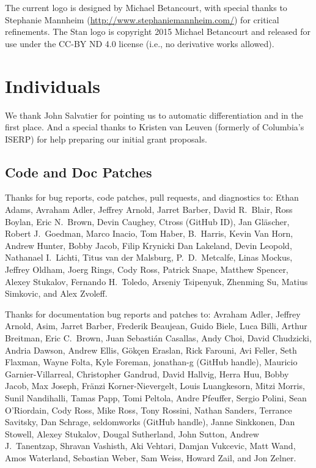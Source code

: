 The current logo is designed by Michael Betancourt, with special
thanks to Stephanie Mannheim (\url{http://www.stephaniemannheim.com/})
for critical refinements.  The Stan logo is copyright 2015 Michael
Betancourt and released for use under the CC-BY ND 4.0 license (i.e.,
no derivative works allowed).


\section*{Individuals}

We thank John Salvatier for pointing us to automatic differentiation
and \HMC in the first place.  And a special thanks to Kristen van
Leuven (formerly of Columbia's ISERP) for help preparing our initial
grant proposals.

\subsection*{Code  and Doc Patches}

Thanks for bug reports, code patches, pull requests, and diagnostics
to:
Ethan Adams,
Avraham Adler,
Jeffrey Arnold,
Jarret Barber,
David R.~Blair,
Ross Boylan,
Eric N.~Brown,
Devin Caughey,
Ctross (GitHub ID),
Jan Gl\"ascher,
Robert J.\ Goedman,
Marco Inacio,
Tom Haber,
B.~Harris,
Kevin Van Horn,
Andrew Hunter,
Bobby Jacob,
Filip Krynicki
Dan Lakeland,
Devin Leopold,
Nathanael I.~Lichti,
Titus van der Malsburg,
P.~D.~Metcalfe,
Linas Mockus,
Jeffrey Oldham,
Joerg Rings,
Cody Ross,
Patrick Snape,
Matthew Spencer,
Alexey Stukalov,
Fernando H.~Toledo,
Arseniy Tsipenyuk,
Zhenming Su,
Matius Simkovic, and
Alex Zvoleff.

Thanks for documentation bug reports and patches to:
Avraham Adler,
Jeffrey Arnold,
Asim,
Jarret Barber,
Frederik Beaujean,
Guido Biele,
Luca Billi,
Arthur Breitman,
Eric C.~Brown,
Juan Sebasti\'an Casallas,
Andy Choi,
David Chudzicki,
Andria Dawson,
Andrew Ellis,
G\"{o}k\c{c}en Eraslan,
Rick Farouni,
Avi Feller,
Seth Flaxman,
Wayne Folta,
Kyle Foreman,
jonathan-g (GitHub handle),
Mauricio Garnier-Villarreal,
Christopher Gandrud,
David Hallvig,
Herra Huu,
Bobby Jacob,
Max Joseph,
Fr\"anzi Korner-Nievergelt,
Louis Luangkesorn,
Mitzi Morris,
Sunil Nandihalli,
Tamas Papp,
Tomi Peltola,
Andre Pfeuffer,
Sergio Polini,
Sean O'Riordain,
Cody Ross,
Mike Ross,
Tony Rossini,
Nathan Sanders,
Terrance Savitsky,
Dan Schrage,
seldomworks (GitHub handle),
Janne Sinkkonen,
Dan Stowell,
Alexey Stukalov,
Dougal Sutherland,
John Sutton,
Andrew J.~Tanentzap,
Shravan Vashisth,
Aki Vehtari,
Damjan Vukcevic,
Matt Wand,
Amos Waterland,
Sebastian Weber,
Sam Weiss,
Howard Zail, and
Jon Zelner.

